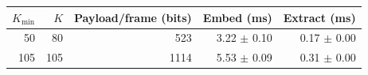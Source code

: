\begin{tabular}{rrrrr}
\toprule
$K_{\min}$ & $K$ & Payload/frame (bits) & Embed (ms) & Extract (ms)\\
\midrule
50 & 80 & 523 & 3.22 $\pm$ 0.10 & 0.17 $\pm$ 0.00\\
105 & 105 & 1114 & 5.53 $\pm$ 0.09 & 0.31 $\pm$ 0.00\\
\bottomrule
\end{tabular}
